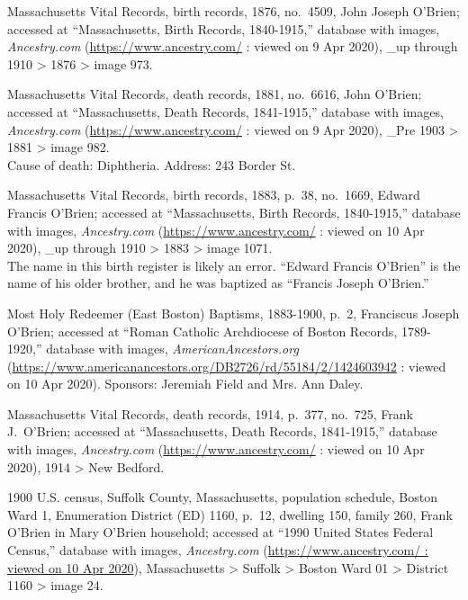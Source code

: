 \begin{thebibliography}{99}
	Massachusetts Vital Records, birth records, 1876, no.\ 4509, John Joseph O'Brien; accessed at ``Massachusetts, Birth Records, 1840-1915,'' database with images, \textit{Ancestry.com} (\url{https://www.ancestry.com/} : viewed on 9 Apr 2020), \_up through 1910 > 1876 > image 973.
	
	Massachusetts Vital Records, death records, 1881, no.\ 6616, John O'Brien; accessed at ``Massachusetts, Death Records, 1841-1915,'' database with images, \textit{Ancestry.com} (\url{https://www.ancestry.com/} : viewed on 9 Apr 2020), \_Pre 1903 > 1881 > image 982.\\
	Cause of death: Diphtheria. Address: 243 Border St.
	
	Massachusetts Vital Records, birth records, 1883, p.\ 38, no.\ 1669, Edward Francis O'Brien; accessed at ``Massachusetts, Birth Records, 1840-1915,'' database with images, \textit{Ancestry.com} (\url{https://www.ancestry.com/} : viewed on 10 Apr 2020), \_up through 1910 > 1883 > image 1071.\\
	The name in this birth register is likely an error. ``Edward Francis O'Brien'' is the name of his older brother, and he was baptized as ``Francis Joseph O'Brien.''
	
	Most Holy Redeemer (East Boston) Baptisms, 1883-1900, p.\ 2, Franciscus Joseph O'Brien; accessed at ``Roman Catholic Archdiocese of Boston Records, 1789-1920,'' database with images, \textit{AmericanAncestors.org} (\url{https://www.americanancestors.org/DB2726/rd/55184/2/1424603942} : viewed on 10 Apr 2020).	
	Sponsors: Jeremiah Field and Mrs. Ann Daley.
	
	Massachusetts Vital Records, death records, 1914, p.\ 377, no.\ 725, Frank J.\ O'Brien; accessed at ``Massachusetts, Death Records, 1841-1915,'' database with images, \textit{Ancestry.com} (\url{https://www.ancestry.com/} : viewed on 10 Apr 2020), 1914 > New Bedford.
	
	1900 U.S. census, Suffolk County, Massachusetts, population schedule, Boston Ward 1, Enumeration District (ED) 1160, p.\ 12, dwelling 150, family 260, Frank O'Brien in Mary O'Brien household; accessed at ``1990 United States Federal Census,'' database with images, \textit{Ancestry.com} (\url{https://www.ancestry.com/ : viewed on 10 Apr 2020}), Massachusetts > Suffolk > Boston Ward 01 > District 1160 > image 24.
	

\end{thebibliography}
